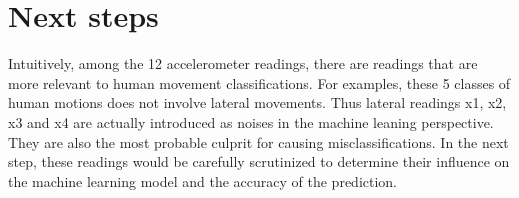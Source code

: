 \documentclass{cs229report}
\begin{document}
\section{Next steps}
Intuitively, among the 12 accelerometer readings, there are readings that are more relevant to human movement classifications. For examples, these 5 classes of human motions does not involve lateral movements. Thus lateral readings x1, x2, x3 and x4 are actually introduced as noises in the machine leaning perspective. They are also the most probable culprit for causing misclassifications. In the next step, these readings would be carefully scrutinized to determine their influence on the  machine learning model and the accuracy of the prediction.
\end{document}
